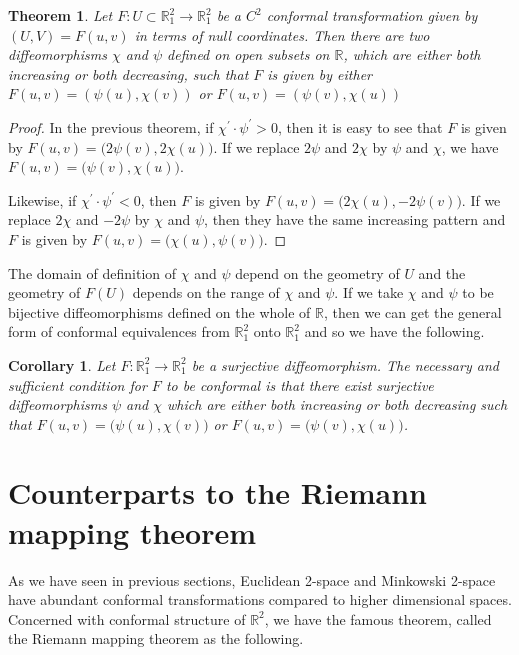 \documentclass[a4paper,10pt]{amsart}
\theoremstyle{plain}
\newtheorem{thm}{Theorem}[section]
\newtheorem*{corollary}{Corollary}
\newtheorem*{main theorem}{Theorem}
\theoremstyle{definition}
\begin{document}
\begin{thm} \label{null}
Let $F : U \subset \mathbb{R}^2_1 \rightarrow \mathbb{R}^2_1$ be a
$C^2$ conformal transformation given by $(U,V) = F(u,v)$ in terms
of null coordinates. Then there are two diffeomorphisms $\chi$ and
$\psi$ defined on open subsets on $\mathbb{R}$, which are either
both increasing or both decreasing, such that $F$ is given by
either $F(u,v) = ( \psi(u), \chi(v) )$ or $F(u,v) = ( \psi(v),
\chi(u))$
\end{thm}
\begin{proof}
In the previous theorem, if $\chi^\prime \cdot \psi^\prime > 0$,
then it is easy to see that $F$ is given by $F(u,v) = \big(
2\psi(v), 2\chi(u) \big)$. If we replace $2\psi$ and $2\chi$ by
$\psi$ and $\chi$, we have $F(u,v) = \big(\psi(v), \chi(u) \big)$.

Likewise, if $\chi^\prime \cdot \psi^\prime < 0$, then $F$ is
given by $F(u,v) = \big( 2\chi(u), -2\psi(v) \big)$. If we replace
$2\chi$ and $-2\psi$ by $\chi$ and $\psi$, then they have the same
increasing pattern and $F$ is given by $F(u,v) = \big( \chi(u),
\psi(v) \big)$.
\end{proof}


The domain of definition of $\chi$ and $\psi$ depend on the
geometry of $U$ and the geometry of $F(U)$ depends on the range of
$\chi$ and $\psi$. If we take $\chi$ and $\psi$ to be  bijective
diffeomorphisms defined on the whole of $\mathbb{R}$, then we can
get the general form of conformal equivalences from
$\mathbb{R}^2_1$ onto $\mathbb{R}^2_1$ and so we have the
following.

\begin{corollary}
Let $F : \mathbb{R}^2_1 \rightarrow \mathbb{R}^2_1$ be a
surjective diffeomorphism. The necessary and sufficient condition
for $F$ to be conformal is that there exist surjective
diffeomorphisms $\psi$ and $\chi$ which are either both increasing
or both decreasing such that $F(u,v) = \big( \psi(u), \chi(v)
\big)$ or $F(u,v) = \big( \psi(v), \chi(u) \big)$.
\end{corollary}



\section{Counterparts to the Riemann mapping theorem}

As we have seen in previous sections, Euclidean 2-space and
Minkowski 2-space have abundant conformal transformations compared
to higher dimensional spaces. Concerned with conformal structure
of $\mathbb{R}^2$, we have the famous theorem, called the Riemann
mapping theorem as the following.
\end{document}
